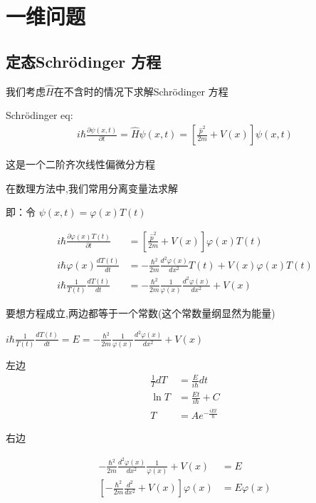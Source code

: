 \documentclass[lang=cn,10pt]{elegantbook}
\begin{document}
\chapter{一维问题}
\section{定态Schrödinger 方程}

我们考虑$\hat{H}$在不含时的情况下求解Schrödinger 方程

Schrödinger eq:\begin{align*}
	i \hbar \frac{\partial \psi(x, t)}{\partial t} = \hat{H} \psi(x, t) 
	= \left[ \frac{\hat{p}^2}{2m} + V(x) \right] \psi(x, t)
\end{align*}

这是一个二阶齐次线性偏微分方程

在数理方法中,我们常用分离变量法求解

即：令 \(\psi(x, t) = \varphi(x) T(t)\)

\begin{align*}
	i \hbar \frac{\partial \varphi(x) T(t)}{\partial t} &= \left[ \frac{\hat{p}^2}{2m} + V(x) \right]\varphi(x) T(t) \\
	i \hbar \varphi(x) \frac{d T(t)}{d t} &= -\frac{\hbar^2}{2m} \frac{d^2 \varphi(x)}{d x^2} T(t) + V(x) \varphi(x) T(t) \\
	i \hbar \frac{1}{T(t)} \frac{d T(t)}{d t} &= -\frac{\hbar^2}{2m} \frac{1}{\varphi(x)} \frac{d^2 \varphi(x)}{d x^2} + V(x)
\end{align*}

要想方程成立,两边都等于一个常数(这个常数量纲显然为能量)

$i \hbar \frac{1}{T(t)} \frac{d T(t)}{d t} =E= -\frac{\hbar^2}{2m} \frac{1}{\varphi(x)} \frac{d^2 \varphi(x)}{d x^2} + V(x)$


左边
\begin{align*}
	\frac{1}{T} dT &= \frac{E}{i\hbar} dt \\
	\ln T &= \frac{Et}{i\hbar} + C \\
	T &= A e^{-\frac{iEt}{\hbar}}
\end{align*}

右边

\begin{align*}
	-\frac{\hbar^2}{2m} \frac{d^2 \varphi(x)}{dx^2} \frac{1}{\varphi(x)} + V(x) &= E \\
	\left[ -\frac{\hbar^2}{2m} \frac{d^2}{dx^2} + V(x) \right] \varphi(x) &= E \varphi(x)
\end{align*}
\end{document}

